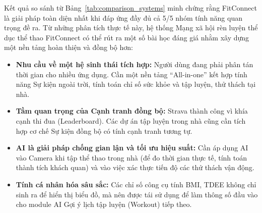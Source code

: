 Kết quả so sánh từ Bảng~\ref{tab:comparison_systems} minh chứng rằng FitConnect là giải pháp toàn diện nhất khi đáp ứng đầy đủ cả 5/5 nhóm tính năng quan trọng đề ra. Từ những phân tích thực tế này, hệ thống Mạng xã hội rèn luyện thể dục thể thao FitConnect có thể rút ra một số bài học đáng giá nhằm xây dựng một nền tảng hoàn thiện và đồng bộ hơn:
\begin{itemize}
    \item \textbf{Nhu cầu về một hệ sinh thái tích hợp:} Người dùng đang phải phân tán thời gian cho nhiều ứng dụng. Cần một nền tảng ``All-in-one'' kết hợp tính năng Sự kiện ngoài trời, tính toán chỉ số sức khỏe và tập luyện, thử thách tại nhà.
    \item \textbf{Tầm quan trọng của Cạnh tranh đồng bộ:} Strava thành công vì khía cạnh thi đua (Leaderboard). Các dự án tập luyện trong nhà cũng cần tích hợp cơ chế Sự kiện đồng bộ có tính cạnh tranh tương tự.
    \item \textbf{AI là giải pháp chống gian lận và tối ưu hiệu suất:} Cần áp dụng AI vào Camera khi tập thể thao trong nhà (để đo thời gian thực tế, tính toán thành tích khách quan) và vào việc xác thực tiến độ các thử thách vận động.
    \item \textbf{Tính cá nhân hóa sâu sắc:} Các chỉ số công cụ tính BMI, TDEE không chỉ sinh ra để hiển thị biểu đồ, mà nên được tái sử dụng để làm thông số đầu vào cho module AI Gợi ý lịch tập luyện (Workout) tiếp theo.
\end{itemize}

